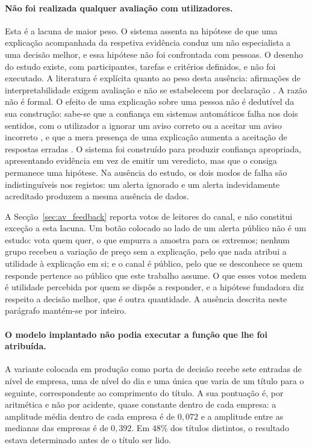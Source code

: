 \paragraph{Não foi realizada qualquer avaliação com utilizadores.}
Esta é a lacuna de maior peso. O sistema assenta na hipótese de que uma explicação acompanhada da
respetiva evidência conduz um não especialista a uma decisão melhor, e essa hipótese não foi
confrontada com pessoas. O desenho do estudo existe, com participantes, tarefas e critérios
definidos, e não foi executado. A literatura é explícita quanto ao peso desta ausência: afirmações
de interpretabilidade exigem avaliação e não se estabelecem por declaração
\autocite{doshivelez2018considerations}. A razão não é formal. O efeito de uma explicação sobre uma pessoa
não é dedutível da sua construção: sabe-se que a confiança em sistemas automáticos falha nos dois
sentidos, com o utilizador a ignorar um aviso correto ou a aceitar um aviso incorreto
\autocite{lee2004trust}, e que a mera presença de uma explicação aumenta a aceitação de respostas
erradas \autocite{bansal2021whole}. O sistema foi construído para produzir confiança apropriada,
apresentando evidência em vez de emitir um veredicto, mas que o consiga permanece uma hipótese. Na
ausência do estudo, os dois modos de falha são indistinguíveis nos registos: um alerta ignorado e um
alerta indevidamente acreditado produzem a mesma ausência de dados.

A Secção~\ref{sec:av_feedback} reporta votos de leitores do canal, e não constitui
exceção a esta lacuna. Um botão colocado ao lado de um alerta público não é um estudo:
vota quem quer, o que empurra a amostra para os extremos; nenhum grupo recebeu a variação
de preço sem a explicação, pelo que nada atribui a utilidade à explicação em si; e o canal
é público, pelo que se desconhece se quem responde pertence ao público que este trabalho
assume. O que esses votos medem é utilidade percebida por quem se dispôs a responder, e a
hipótese fundadora diz respeito a decisão melhor, que é outra quantidade. A ausência
descrita neste parágrafo mantém-se por inteiro.

\paragraph{O modelo implantado não podia executar a função que lhe foi atribuída.}
A variante colocada em produção como porta de decisão recebe sete entradas de nível de empresa, uma
de nível do dia e uma única que varia de um título para o seguinte, correspondente ao comprimento do
título. A sua pontuação é, por aritmética e não por acidente, quase constante dentro de cada
empresa: a amplitude média dentro de cada empresa é de $0{,}072$ e a amplitude entre as medianas das
empresas é de $0{,}392$. Em $48\%$ dos títulos distintos, o resultado estava determinado antes de o
título ser lido.

